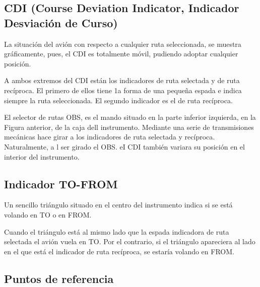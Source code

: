 \subsection{CDI  (Course Deviation Indicator, Indicador Desviación de Curso)}

La situación del avión con respecto a cualquier ruta seleccionada, se muestra gráficamente, pues, el CDI es totalmente móvil, pudiendo adoptar cualquier posición.

A ambos extremos del CDI están los indicadores de ruta selectada y de ruta recíproca. El primero de ellos tiene 1a forma de una pequeña espada e indica siempre la ruta seleccionada. El segundo indicador es el de ruta recíproca.

El selector de rutas OBS, es el mando situado en la parte inferior izquierda, en la Figura anterior, de la caja dell instrumento. Mediante una serie de transmisiones mecánicas hace girar a los indicadores de ruta selectada y recíproca. Naturalmente, a l ser girado el OBS. eI CDI también variara su posición en el interior del instrumento.

\subsection{Indicador TO-FROM}

Un sencillo triángulo situado en el centro del instrumento indica si se está volando en TO o en FROM.

Cuando el triángulo está al mismo lado que la espada indicadora de ruta selectada el avión vuela en TO. Por el contrario, si el triángulo apareciera al lado en el que está el indicador de ruta recíproca, se estaría volando en FROM.

\subsection{Puntos de referencia}

